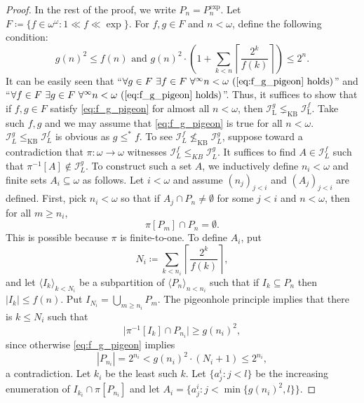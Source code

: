 \documentclass[10pt,a4paper]{amsart}
\newcommand{\I}{\mathscr{I}}
\newcommand{\oo}{{\omega}^\omega}
\renewcommand{\subset}{\subseteq}
\begin{document}
    \begin{proof}
    	In the rest of the proof, we write $P_n = P_n^{\exp}$. 
    	Let $F\coloneqq\{f\in\oo:1\ll f\ll\exp\}$.
    	For $f,g\in F$ and $n<\omega$, define the following condition:
    	\begin{equation}
    		\label{eq:f_g_pigeon}
    		g(n)^2\leq f(n)\text{ and }g(n)^2 \cdot \left( 1+\sum_{k<n} \left\lceil \frac{2^k}{f(k)} \right\rceil \right) \leq 2^n.
    	\end{equation}
    	It can be easily seen that ``$\forall g\in F~\exists f\in F~\forall^\infty n<\omega~(\text{\eqref{eq:f_g_pigeon} holds})$'' and ``$\forall f\in F~\exists g\in F~\forall^\infty n<\omega~(\text{\eqref{eq:f_g_pigeon} holds})$''.
    	Thus, it suffices to show that if $f,g\in F$ satisfy \eqref{eq:f_g_pigeon} for almost all $n<\omega$, then $\mathscr{I}_{\mathrm{L}}^g\lneq_{\mathrm{KB}}\mathscr{I}_{\mathrm{L}}^f$.
    	Take such $f,g$ and we may assume that \eqref{eq:f_g_pigeon} is true for all $n<\omega$. $\I_L^g \leq_{\mathrm{KB}}\I_L^f$ is obvious as $g\leq^* f$.	
    	To see $\I_L^f \not\leq_{\mathrm{KB}} \I_L^g$, suppose toward a contradiction that $\pi\colon\omega\to\omega$ witnesses $\I_L^f\leq_{KB}\I_L^g$. It suffices to find $A\in\I_L^f$ such that $\pi^{-1}[A]\notin\I_L^g$.
    	To construct such a set $A$, we inductively define $n_i<\omega$ and finite sets $A_i\subset\omega$ as follows.
    	Let $i<\omega$ and assume $(n_j)_{j<i}$ and $(A_j)_{j<i}$ are defined.
    	First, pick $n_i<\omega$ so that if $A_j\cap P_n\neq\emptyset$ for some $j<i$ and $n<\omega$, then for all $m\geq n_i$,
    	\begin{equation}\label{eqn:disjointness}
    		\pi[P_m]\cap P_n = \emptyset.
    	\end{equation}
    	This is possible because $\pi$ is finite-to-one. 
    	To define $A_i$, 
    	put \[N_i \coloneqq \sum_{k<n_i} \left\lceil \frac{2^k}{f(k)} \right\rceil ,\]
    	and let $\langle I_k\rangle_{k< N_i}$ be a subpartition of $\langle P_n\rangle_{n< n_i}$ such that if $I_k \subseteq P_n$ then $|I_k|\leq f(n)$. Put $I_{N_i} = \bigcup_{m\geq n_i}P_m$. The pigeonhole principle implies that there is $k\leq N_i$ such that
    	\[
    	\lvert\pi^{-1}[I_k]\cap P_{n_i}\rvert \geq g(n_i)^2,
    	\]
    	since otherwise \eqref{eq:f_g_pigeon} implies
    	\[|P_{n_i}|=2^{n_i}<g(n_i)^2\cdot (N_i+1)\leq 2^{n_i},\]
    	a contradiction.
    	Let $k_i$ be the least such $k$. Let $\{a^i_j: j<l\}$ be the increasing enumeration of $I_{k_i}\cap\pi[P_{n_i}]$ and let $A_i = \{a^i_j:j<\min\{g(n_i)^2, l\}\}$.
    	

\end{proof}
\end{document}
